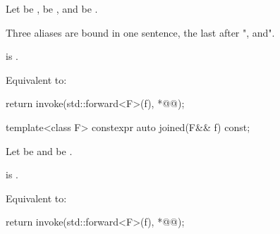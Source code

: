 \begin{itemdescr}
\pnum
Let  be ,  be , and  be .

\pnum
Three aliases are bound in one sentence, the last after ", and".

\pnum
\mandates
{} is .

\pnum
\effects
Equivalent to:
\begin{codeblock}
return invoke(std::forward<F>(f), *@@);
\end{codeblock}
\end{itemdescr}

%
\begin{itemdecl}
template<class F>
  constexpr auto joined(F&& f) const;
\end{itemdecl}

\begin{itemdescr}
\pnum
Let  be  and  be .

\pnum
\mandates
{} is .

\pnum
\effects
Equivalent to:
\begin{codeblock}
return invoke(std::forward<F>(f), *@@);
\end{codeblock}
\end{itemdescr}
